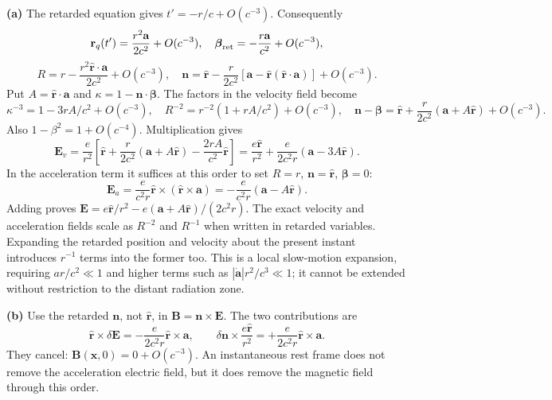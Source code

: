 \textbf{(a)} The retarded equation gives
$t'=-r/c+O(c^{-3})$. Consequently
\[
\mathbf r_q(t')=\frac{r^2\mathbf a}{2c^2}+O(c^{-3}),\quad
\boldsymbol\beta_{\rm ret}=-\frac{r\mathbf a}{c^2}+O(c^{-3}),
\]
\[
R=r-\frac{r^2\hat{\mathbf r}\cdot\mathbf a}{2c^2}+O(c^{-3}),\quad
\mathbf n=\hat{\mathbf r}-\frac r{2c^2}
[\mathbf a-\hat{\mathbf r}(\hat{\mathbf r}\cdot\mathbf a)]+O(c^{-3}).
\]
Put $A=\hat{\mathbf r}\cdot\mathbf a$ and
$\kappa=1-\mathbf n\cdot\boldsymbol\beta$. The factors in the velocity
field become
\[
\kappa^{-3}=1-3rA/c^2+O(c^{-3}),\quad
R^{-2}=r^{-2}(1+rA/c^2)+O(c^{-3}),\quad
\mathbf n-\boldsymbol\beta=\hat{\mathbf r}
+\frac r{2c^2}(\mathbf a+A\hat{\mathbf r})+O(c^{-3}).
\]
Also $1-\beta^2=1+O(c^{-4})$. Multiplication gives
\[
\mathbf E_v=\frac e{r^2}\left[
\hat{\mathbf r}+\frac r{2c^2}(\mathbf a+A\hat{\mathbf r})
-\frac{2rA}{c^2}\hat{\mathbf r}\right]
=\frac{e\hat{\mathbf r}}{r^2}
+\frac e{2c^2r}(\mathbf a-3A\hat{\mathbf r}).
\]
In the acceleration term it suffices at this order to set
$R=r$, $\mathbf n=\hat{\mathbf r}$, $\boldsymbol\beta=0$:
\[
\mathbf E_a=\frac e{c^2r}\hat{\mathbf r}\times
(\hat{\mathbf r}\times\mathbf a)
=-\frac e{c^2r}(\mathbf a-A\hat{\mathbf r}).
\]
Adding proves $\mathbf E=e\hat{\mathbf r}/r^2-
 e(\mathbf a+A\hat{\mathbf r})/(2c^2r)$.
The exact velocity and acceleration fields scale as $R^{-2}$ and $R^{-1}$
when written in retarded variables. Expanding the retarded position and
velocity about the present instant introduces $r^{-1}$ terms into the
former too. This is a local slow-motion expansion, requiring
$ar/c^2\ll1$ and higher terms such as $|\dot{\mathbf a}|r^2/c^3\ll1$;
it cannot be extended without restriction to the distant radiation zone.

\textbf{(b)} Use the retarded $\mathbf n$, not $\hat{\mathbf r}$, in
$\mathbf B=\mathbf n\times\mathbf E$. The two contributions are
\[
\hat{\mathbf r}\times\delta\mathbf E
=-\frac e{2c^2r}\hat{\mathbf r}\times\mathbf a,\qquad
\delta\mathbf n\times\frac{e\hat{\mathbf r}}{r^2}
=+\frac e{2c^2r}\hat{\mathbf r}\times\mathbf a.
\]
They cancel: $\boxed{\mathbf B(\mathbf x,0)=0+O(c^{-3})}$.
An instantaneous rest frame does not remove the acceleration electric
field, but it does remove the magnetic field through this order.

